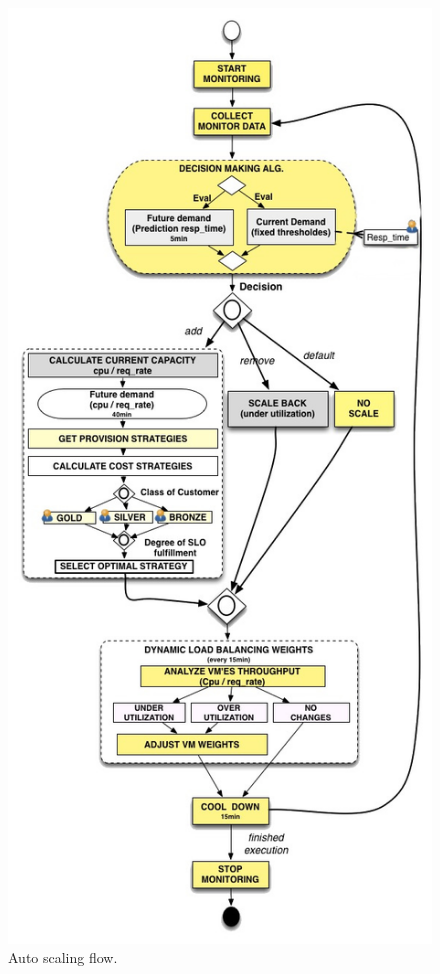\begin{figure}[htb]
  \begin{center}
    \includegraphics[width=\linewidth]{images/NewAutoScalingFlow}
  \end{center}
\vspace{-5mm}
  \caption{Auto scaling flow.}
  \label{autoScalingFlow}
\end{figure}


